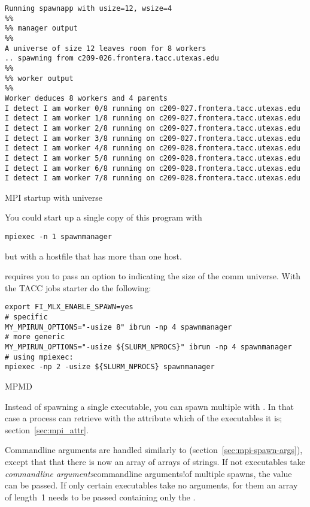 \begin{verbatim}
Running spawnapp with usize=12, wsize=4
%%
%% manager output
%%
A universe of size 12 leaves room for 8 workers
.. spawning from c209-026.frontera.tacc.utexas.edu
%%
%% worker output
%%
Worker deduces 8 workers and 4 parents
I detect I am worker 0/8 running on c209-027.frontera.tacc.utexas.edu
I detect I am worker 1/8 running on c209-027.frontera.tacc.utexas.edu
I detect I am worker 2/8 running on c209-027.frontera.tacc.utexas.edu
I detect I am worker 3/8 running on c209-027.frontera.tacc.utexas.edu
I detect I am worker 4/8 running on c209-028.frontera.tacc.utexas.edu
I detect I am worker 5/8 running on c209-028.frontera.tacc.utexas.edu
I detect I am worker 6/8 running on c209-028.frontera.tacc.utexas.edu
I detect I am worker 7/8 running on c209-028.frontera.tacc.utexas.edu
\end{verbatim}

 {MPI startup with universe}

You could start up a single copy of this program with 
\begin{verbatim}
mpiexec -n 1 spawnmanager
\end{verbatim}
but with a hostfile that has more than one host.

\begin{taccnote}
 requires you to pass an option  to
 indicating the size of the comm universe. With the TACC
jobs starter  do the following:
\begin{verbatim}
export FI_MLX_ENABLE_SPAWN=yes
# specific
MY_MPIRUN_OPTIONS="-usize 8" ibrun -np 4 spawnmanager
# more generic
MY_MPIRUN_OPTIONS="-usize ${SLURM_NPROCS}" ibrun -np 4 spawnmanager
# using mpiexec:
mpiexec -np 2 -usize ${SLURM_NPROCS} spawnmanager
\end{verbatim}
\end{taccnote}

 {MPMD}

Instead of spawning a single executable, you can spawn multiple with
.
In that case a process can retrieve with
the attribute
which of the executables it is;
section~\ref{sec:mpi_attr}.

Commandline arguments are handled similarly to 
(section~\ref{sec:mpi-spawn-args}),
except that that there is now an array of arrays of strings.
If not executables take
\emph{commandline arguments}{commandline arguments!of multiple spawns},
the value  can be passed.
If only certain executables take no arguments,
for them an array of length~1 needs to be passed containing only the
.

